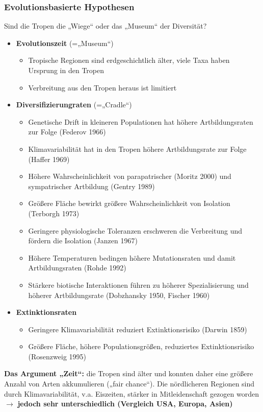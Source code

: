 \newpage
\subsubsection{Evolutionsbasierte Hypothesen}
Sind die Tropen die „Wiege“ oder das „Museum“ der Diversität?

\begin{itemize}
	\item \textbf{Evolutionszeit} (=„Museum“)
	\begin{itemize}
		\item Tropische Regionen sind erdgeschichtlich älter, viele Taxa haben Ursprung in den Tropen
		\item Verbreitung aus den Tropen heraus ist limitiert
	\end{itemize}
	\item \textbf{Diversifizierungraten} (=„Cradle“)
	\begin{itemize}
		\item Genetische Drift in kleineren Populationen hat höhere Artbildungsraten zur Folge (Federov 1966)
		\item Klimavariabilität hat in den Tropen höhere Artbildungsrate zur Folge (Haffer 1969)
		\item Höhere Wahrscheinlichkeit von parapatrischer (Moritz 2000) und sympatrischer Artbildung (Gentry 1989)
		\item Größere Fläche bewirkt größere Wahrscheinlichkeit von Isolation (Terborgh 1973)
		\item Geringere physiologische Toleranzen erschweren die Verbreitung und fördern die Isolation (Janzen 1967)
		\item Höhere Temperaturen bedingen höhere Mutationsraten und damit Artbildungsraten (Rohde 1992)
		\item Stärkere biotische Interaktionen führen zu höherer Spezialisierung und höherer Artbildungsrate (Dobzhansky 1950, Fischer 1960)
	\end{itemize}
	\item \textbf{Extinktionsraten}
	\begin{itemize}
		\item Geringere Klimavariabilität reduziert Extinktionsrisiko (Darwin 1859)
		\item Größere Fläche, höhere Populationsgrößen, reduziertes Extinktionsrisiko (Rosenzweig 1995)
	\end{itemize}
\end{itemize}

\textbf{Das Argument „Zeit“:} die Tropen sind älter und konnten daher eine größere Anzahl von Arten akkumulieren („fair chance“). Die nördlicheren Regionen sind durch Klimavariabilität, v.a. Eiszeiten, stärker in Mitleidenschaft gezogen worden $\rightarrow$ \textbf{jedoch sehr unterschiedlich (Vergleich USA, Europa, Asien)}